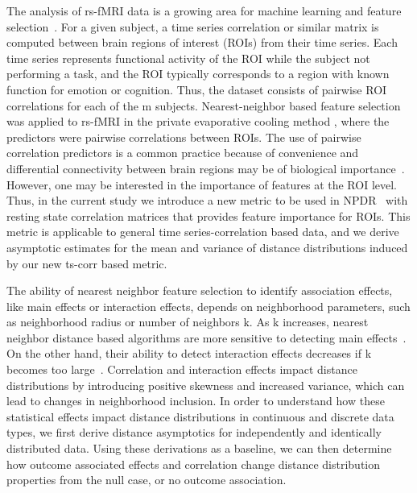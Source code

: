 \documentclass[aoas]{imsart}
\begin{document}
The analysis of rs-fMRI data is a growing area for machine learning and feature selection~\cite{venkataraman2010,hay2017,sundermann2014,vergun2013}. For a given subject, a time series correlation or similar matrix is computed between brain regions of interest (ROIs) from their time series. Each time series represents functional activity of the ROI while the subject not performing a task, and the ROI typically corresponds to a region with known function for emotion or cognition.  Thus, the dataset consists of pairwise ROI correlations for each of the m subjects. Nearest-neighbor based feature selection was applied to rs-fMRI in the private evaporative cooling method \cite{le17}, where the predictors were pairwise correlations between ROIs. The use of pairwise correlation predictors is a common practice because of convenience and differential connectivity between brain regions may be of biological importance~\cite{gotts2012}. However, one may be interested in the importance of features at the ROI level. Thus, in the current study we introduce a new metric to be used in NPDR~\cite{npdr} with resting state correlation matrices that provides feature importance for ROIs. This metric is applicable to general time series-correlation based data, and we derive asymptotic estimates for the mean and variance of distance distributions induced by our new ts-corr based metric.


The ability of nearest neighbor feature selection to identify association effects, like main effects or interaction effects, depends on neighborhood parameters, such as neighborhood radius or number of neighbors k. As k increases, nearest neighbor distance based algorithms are more sensitive to detecting main effects~\cite{stir}. On the other hand, their ability to detect interaction effects decreases if k becomes too large~\cite{stir,mckinney13}. Correlation and interaction effects impact distance distributions by introducing positive skewness and increased variance, which can lead to changes in neighborhood inclusion. In order to understand how these statistical effects impact distance distributions in continuous and discrete data types, we first derive distance asymptotics for independently and identically distributed data. Using these derivations as a baseline, we can then determine how outcome associated effects and correlation change distance distribution properties from the null case, or no outcome association. 
\end{document}
